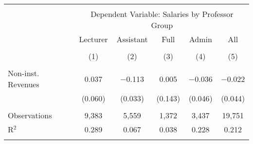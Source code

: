 
\begin{tabular}{@{\extracolsep{5pt}}lccccc} 
\\[-1.8ex]\hline 
\hline \\[-1.8ex] 
 & \multicolumn{5}{c}{Dependent Variable: Salaries by Professor Group} \\ 
\cline{2-6} 
 & Lecturer & Assistant & Full & Admin & All \\ 
\\[-1.8ex] & (1) & (2) & (3) & (4) & (5)\\ 
\hline \\[-1.8ex] 
 Non-inst. Revenues & 0.037 & $-$0.113 & 0.005 & $-$0.036 & $-$0.022 \\ 
  & (0.060) & (0.033) & (0.143) & (0.046) & (0.044) \\ 
 \hline \\[-1.8ex] 
Observations & 9,383 & 5,559 & 1,372 & 3,437 & 19,751 \\ 
R$^{2}$ & 0.289 & 0.067 & 0.038 & 0.228 & 0.212 \\ 
\hline 
\hline \\[-1.8ex] 
\end{tabular} 
